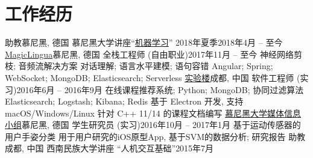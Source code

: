 \section{\textbf{工作经历}}
  \resumeSubHeadingListStart
    \resumeSubheading
      {助教}{慕尼黑, 德国}
      {慕尼黑大学讲座``\href{http://www.dbs.ifi.lmu.de/cms/studium_lehre/lehre_master/ml18/index.html}{机器学习}'' 2018年夏季}{2018年4月 -- 至今}
    \resumeSubheading
    {\href{https://magiclingua.com/}{MagicLingua}}{慕尼黑, 德国}
    {全栈工程师 (自由职业)}{2017年11月 -- 至今}
    \resumeItemListStart
        {神经网络剪枝; 音频流解决方案}
        {对话理解; 语言水平建模; 语句容错}
        {Angular; Spring; WebSocket; MongoDB; Elasticsearch; Serverless}
    \resumeItemListEnd
    \resumeSubheading
      {\href{https://shiyanlou.com/}{实验楼}}{成都, 中国}
      {软件工程师 (实习)}{2016年6月 -- 2016年9月}
      \resumeItemListStart
          {在线课程推荐系统; Python; MongoDB; 协同过滤算法}
          {Elasticsearch; Logstash; Kibana; Redis}
          {基于 Electron 开发, 支持 macOS/Windows/Linux}
          {针对 C++ 11/14 的课程文档编写}
      \resumeItemListEnd
    \resumeSubheading
      {\href{http://www.medien.ifi.lmu.de}{慕尼黑大学媒体信息小组}}{慕尼黑, 德国}
      {学生研究员 (实习)}{2016年10月 -- 2017年1月}
      \resumeItemListStart
          {基于运动传感器的用户手姿分类}
          {用于用户研究的iOS原型App, 基于SVM的数据分析; 研究报告}
      \resumeItemListEnd
    \resumeSubheading
      {助教}{成都, 中国}
      {西南民族大学讲座 ``人机交互基础''}{2015年7月}
  \resumeSubHeadingListEnd